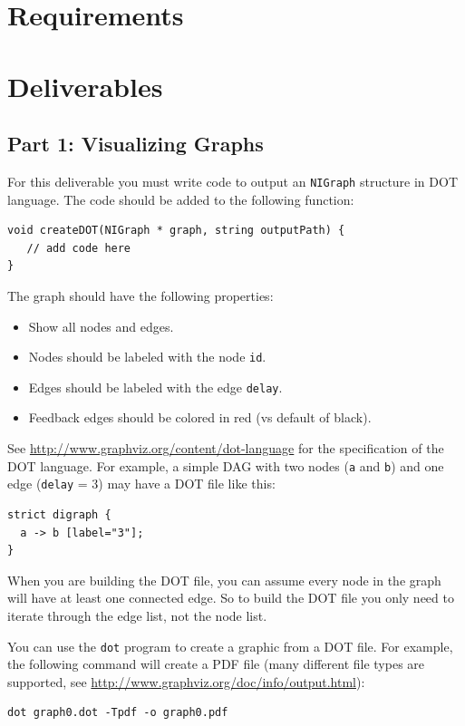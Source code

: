 \section{Requirements}

\section{Deliverables}

\subsection{Part 1: Visualizing Graphs}
\label{sec:del1}

For this deliverable you must write code to output an {\tt NIGraph} structure in DOT language.  The code should be added to the following function:

\begin{lstlisting}
void createDOT(NIGraph * graph, string outputPath) {
   // add code here
}
\end{lstlisting}

The graph should have the following properties:
\begin{itemize}
	\item Show all nodes and edges.
	\item Nodes should be labeled with the node {\tt id}.
	\item Edges should be labeled with the edge {\tt delay}.
	\item Feedback edges should be colored in red (vs default of black).
\end{itemize}

See \url{http://www.graphviz.org/content/dot-language} for the specification of the DOT language.  For example, a simple DAG with two nodes ({\tt a} and {\tt b}) and one edge ({\tt delay} = 3) may have a DOT file like this:

\begin{lstlisting}
strict digraph {
  a -> b [label="3"];
}
\end{lstlisting}
When you are building the DOT file, you can assume every node in the graph will have at least one connected edge.  So to build the DOT file you only need to iterate through the edge list, not the node list.


You can use the {\tt dot} program to create a graphic from a DOT file.  For example, the following command will create a PDF file (many different file types are supported, see \url{http://www.graphviz.org/doc/info/output.html}):
\begin{lstlisting}
dot graph0.dot -Tpdf -o graph0.pdf
\end{lstlisting}

